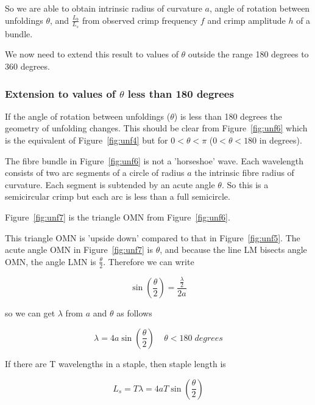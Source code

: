\documentclass[titlepage,10pt]{article}  %
\begin{document}
So we are able to obtain intrinsic radius of curvature $a$, angle of rotation between unfoldings $\theta$, and $\frac{L_{b}}{L_{s}}$  from observed crimp frequency $f$ and crimp amplitude $h$ of a bundle.

We now need to extend this result to values of $\theta$ outside the range 180 degrees to 360 degrees.

\subsubsection{Extension to values of $\theta$ less than 180 degrees}
If the angle of rotation between unfoldings ($\theta$) is less than 180 degrees the geometry of unfolding changes. This should be clear from Figure~\ref{fig:unf6} which is the 
equivalent of Figure~\ref{fig:unf4} but for $0 < \theta < \pi$ ($0 < \theta < 180$ in degrees).



The fibre bundle in Figure~\ref{fig:unf6} is not a 'horseshoe' wave. Each wavelength consists of two arc segments of a circle of radius $a$ the intrinsic fibre radius of curvature. Each segment is subtended by an acute angle $\theta$. So this is a semicircular crimp but each arc is less than a full semicircle.

Figure~\ref{fig:unf7} is the triangle OMN from Figure~\ref{fig:unf6}.



 This triangle OMN is 'upside down' compared to that in Figure~\ref{fig:unf5}. The acute angle OMN in Figure~\ref{fig:unf7} is $\theta$, and because the line LM bisects angle OMN, the angle LMN is $\frac{\theta}{2}$. Therefore we can write 

\begin{displaymath}
\sin\left(\frac{\theta}{2}\right) = \frac{\frac{\lambda}{2}}{2a}
\end{displaymath}

so we can get $\lambda$ from $a$ and $\theta$ as follows

\begin{displaymath}
\lambda = 4 a \sin\left(\frac{\theta}{2}\right) \;\;\;\;   \theta < 180 \; degrees
\end{displaymath}

If there are T wavelengths in a staple, then staple length is 

\begin{displaymath}
L_{s} = T \lambda = 4a T \sin\left(\frac{\theta}{2}\right)
\end{displaymath}
\end{document}
